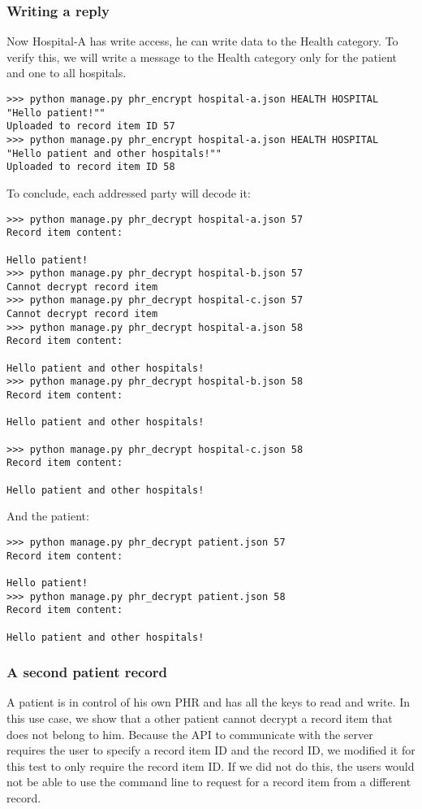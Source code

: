\documentclass[a4paper]{article}
\begin{document}
		\subsubsection{Writing a reply}\label{sec:usecase_7}
			Now Hospital-A has write access, he can write data to the Health category. To verify this, we will write a message to the Health category only for the patient and one to all hospitals.
			
			\begin{lstlisting}
>>> python manage.py phr_encrypt hospital-a.json HEALTH HOSPITAL "Hello patient!""
Uploaded to record item ID 57
>>> python manage.py phr_encrypt hospital-a.json HEALTH HOSPITAL "Hello patient and other hospitals!""
Uploaded to record item ID 58
			\end{lstlisting}
			
			To conclude, each addressed party will decode it:

			\begin{lstlisting}
>>> python manage.py phr_decrypt hospital-a.json 57
Record item content:

Hello patient!
>>> python manage.py phr_decrypt hospital-b.json 57
Cannot decrypt record item
>>> python manage.py phr_decrypt hospital-c.json 57
Cannot decrypt record item
>>> python manage.py phr_decrypt hospital-a.json 58
Record item content:

Hello patient and other hospitals!
>>> python manage.py phr_decrypt hospital-b.json 58
Record item content:

Hello patient and other hospitals!

>>> python manage.py phr_decrypt hospital-c.json 58
Record item content:

Hello patient and other hospitals!
			\end{lstlisting}

			And the patient:

			\begin{lstlisting}
>>> python manage.py phr_decrypt patient.json 57
Record item content:

Hello patient!
>>> python manage.py phr_decrypt patient.json 58
Record item content:

Hello patient and other hospitals!
			\end{lstlisting}
		
		\subsubsection{A second patient record}\label{sec:usecase_8}
			A patient is in control of his own PHR and has all the keys to read and write. In this use case, we show that a other patient cannot decrypt a record item that does not belong to him. Because the API to communicate with the server requires the user to specify a record item ID and the record ID, we modified it for this test to only require the record item ID. If we did not do this, the users would not be able to use the command line to request for a record item from a different record.
			
\end{document}
